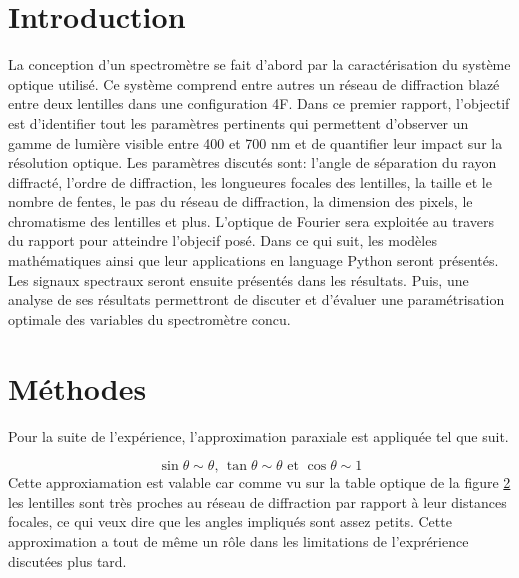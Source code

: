 \documentclass[11pt,letterpaper]{article}
\begin{document}

\twocolumn[]

\section{Introduction}

La conception d'un spectromètre se fait d'abord par la caractérisation du système optique utilisé. Ce système comprend entre autres un réseau de diffraction blazé entre deux lentilles dans une configuration 4F. Dans ce premier rapport, l'objectif est d'identifier tout les paramètres pertinents qui permettent d'observer un gamme de lumière visible entre 400 et 700 nm et de quantifier leur impact sur la résolution optique.
Les paramètres discutés sont: l'angle de séparation du rayon diffracté, l'ordre de diffraction, les longueures focales des lentilles, la taille et le nombre de fentes, le pas du réseau de diffraction, la dimension des pixels, le chromatisme des lentilles et plus. L'optique de Fourier sera exploitée au travers du rapport pour atteindre l'objecif posé. 
Dans ce qui suit, les modèles mathématiques ainsi que leur applications en language Python seront présentés. Les signaux spectraux seront ensuite présentés dans les résultats. Puis, une analyse de ses résultats permettront de discuter et d'évaluer une paramétrisation optimale des variables du spectromètre concu. 
\section{Méthodes}

Pour la suite de l'expérience, l'approximation paraxiale est appliquée tel que suit. 

\begin{equation}
    \sin\theta \sim  \theta\text{, }\tan\theta \sim \theta\text{ et }\cos\theta \sim 1
\end{equation}
 Cette approxiamation est valable car comme vu sur la table optique de la figure \ref{} les lentilles sont très proches au réseau de diffraction par rapport à leur distances focales, ce qui veux dire que les angles impliqués sont assez petits. Cette approximation a tout de même un rôle dans les limitations de l'exprérience discutées plus tard. \cite{article}
\end{document}
